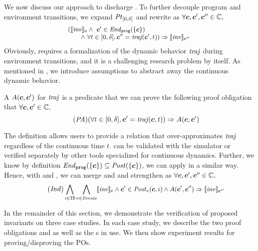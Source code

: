 We now discuss our approach to discharge .
To further decouple program and environment transitions,
we expand $\mathit{Pt}_{[0,\delta]}$  and rewrite  as $\forall \mathit{\boldsymbol{c}}, \mathit{\boldsymbol{c}}', \mathit{\boldsymbol{c}}'' \in \mathbb{C},$
\begin{equation}\label{po:ind-hyp-traj}
\small
\begin{array}{l}
(\llbracket\mathit{inv}\rrbracket_{\mathit{\boldsymbol{c}}} \land\ \mathit{\boldsymbol{c}}' \in \mathit{End}_{\mathtt{prog}}(\left\{\mathit{\boldsymbol{c}}\right\})\\
\qquad  \land\ \forall t \in [0, \delta], \mathit{\boldsymbol{c}}'' = \mathit{traj}(\mathit{\boldsymbol{c}}', t)) \Rightarrow \llbracket\mathit{inv}\rrbracket_{\mathit{\boldsymbol{c}}''}
\end{array}
\end{equation}
Obviously,  requires a formalization of the dynamic behavior $\mathit{traj}$ during environment transitions,
and it is a challenging research problem by itself.
As mentioned in ,
we introduce assumptions to abstract away the continuous dynamic behavior.
\begin{definition}
A \emph{\portasum} $A(\mathit{\boldsymbol{c}}, \mathit{\boldsymbol{c}}')$ for $\mathit{traj}$ is a predicate that
we can prove the following proof obligation that $\forall \mathit{\boldsymbol{c}}, \mathit{\boldsymbol{c}}' \in \mathbb{C},$
\begin{equation}\label{po:port-ass}\tag{\textit{PA}}
(\forall t \in [0,\delta], \gconfig' = \traj(\gconfig, t)) \Rightarrow A(\gconfig, \gconfig')
\end{equation}
\end{definition}
The definition allows users to provide a relation that over-approximates $\mathit{traj}$ regardless of the continuous time $t$.
 can be validated with the \toolname simulator or verified separately by other tools specialized for continuous dynamics.
Further, we know by definition $\mathit{End}_{\mathtt{prog}}(\left\{\mathit{\boldsymbol{c}}\right\}) \subseteq \mathit{Post}(\left\{\mathit{\boldsymbol{c}}\right\})$,
we can apply  in a similar way.
Hence, with  and ,
we can merge  and  and strengthen as
$\forall \mathit{\boldsymbol{c}}, \mathit{\boldsymbol{c}}', \mathit{\boldsymbol{c}}'' \in \mathbb{C},$
\begin{equation}\label{po:ind}\tag{\textit{Ind}}
\small
\bigwedge_{i\in \UINS} \bigwedge_{\Ev \in \Event} \eec{\Inv}{\gconfig} \land \gconfig' \in \Post_\Ev(\gconfig, i)
\land A(\gconfig', \gconfig'')
\Rightarrow \eec{\mathit{inv}}{\gconfig''}
\end{equation}

In the remainder of this section,
we demonstrate the verification of proposed invariants on three case studies.
In each case study, we describe the two proof obligations  and 
as well as the \portasum{}s in use.
We then show experiment results for proving/disproving the POs.



